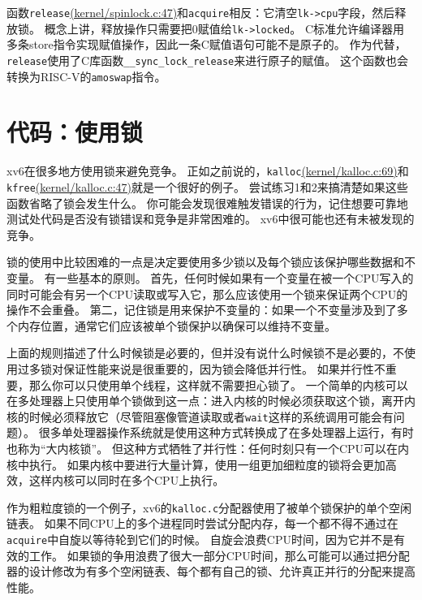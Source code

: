 函数\texttt{release}\href{https://github.com/mit-pdos/xv6-riscv/blob/riscv//kernel/spinlock.c#L47}{(kernel/spinlock.c:47)}和\texttt{acquire}相反：它清空\texttt{lk->cpu}字段，然后释放锁。
概念上讲，释放操作只需要把0赋值给\texttt{lk->locked}。
C标准允许编译器用多条store指令实现赋值操作，因此一条C赋值语句可能不是原子的。
作为代替，\texttt{release}使用了C库函数\texttt{\_\_sync\_lock\_release}来进行原子的赋值。
这个函数也会转换为RISC-V的\texttt{amoswap}指令。

\section{代码：使用锁}
xv6在很多地方使用锁来避免竞争。
正如之前说的，\texttt{kalloc}\href{https://github.com/mit-pdos/xv6-riscv/blob/riscv//kernel/kalloc.c#L69}{(kernel/kalloc.c:69)}和\texttt{kfree}\href{https://github.com/mit-pdos/xv6-riscv/blob/riscv//kernel/kalloc.c#L47}{(kernel/kalloc.c:47)}就是一个很好的例子。
尝试练习1和2来搞清楚如果这些函数省略了锁会发生什么。
你可能会发现很难触发错误的行为，记住想要可靠地测试处代码是否没有锁错误和竞争是非常困难的。
xv6中很可能也还有未被发现的竞争。

锁的使用中比较困难的一点是决定要使用多少锁以及每个锁应该保护哪些数据和不变量。
有一些基本的原则。
首先，任何时候如果有一个变量在被一个CPU写入的同时可能会有另一个CPU读取或写入它，那么应该使用一个锁来保证两个CPU的操作不会重叠。
第二，记住锁是用来保护不变量的：如果一个不变量涉及到了多个内存位置，通常它们应该被单个锁保护以确保可以维持不变量。

上面的规则描述了什么时候锁是必要的，但并没有说什么时候锁不是必要的，不使用过多锁对保证性能来说是很重要的，因为锁会降低并行性。
如果并行性不重要，那么你可以只使用单个线程，这样就不需要担心锁了。
一个简单的内核可以在多处理器上只使用单个锁做到这一点：进入内核的时候必须获取这个锁，离开内核的时候必须释放它（尽管阻塞像管道读取或者\texttt{wait}这样的系统调用可能会有问题）。
很多单处理器操作系统就是使用这种方式转换成了在多处理器上运行，有时也称为“大内核锁”。
但这种方式牺牲了并行性：任何时刻只有一个CPU可以在内核中执行。
如果内核中要进行大量计算，使用一组更加细粒度的锁将会更加高效，这样内核可以同时在多个CPU上执行。

作为粗粒度锁的一个例子，xv6的\texttt{kalloc.c}分配器使用了被单个锁保护的单个空闲链表。
如果不同CPU上的多个进程同时尝试分配内存，每一个都不得不通过在\texttt{acquire}中自旋以等待轮到它们的时候。
自旋会浪费CPU时间，因为它并不是有效的工作。
如果锁的争用浪费了很大一部分CPU时间，那么可能可以通过把分配器的设计修改为有多个空闲链表、每个都有自己的锁、允许真正并行的分配来提高性能。

